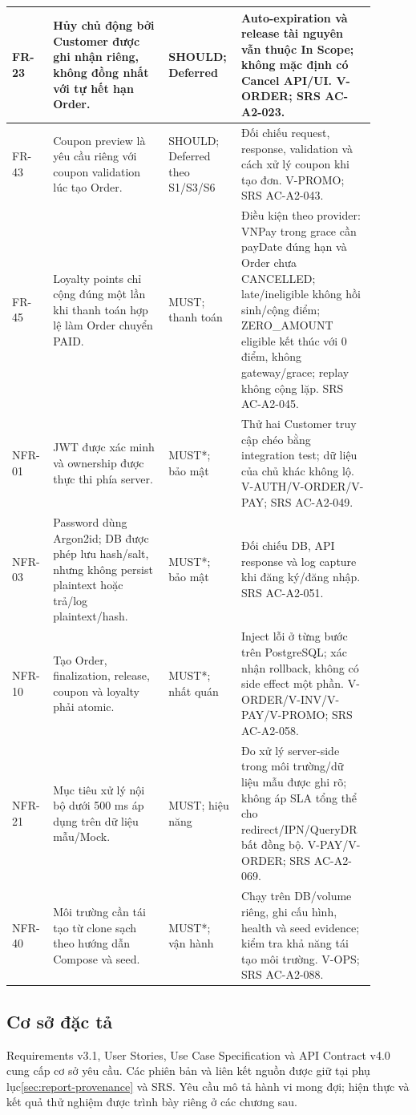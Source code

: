 \begin{longtable}{>{\raggedright\arraybackslash}p{0.10\linewidth}>{\raggedright\arraybackslash}p{0.30\linewidth}>{\raggedright\arraybackslash}p{0.16\linewidth}>{\raggedright\arraybackslash}p{0.34\linewidth}}
FR-23 & Hủy chủ động bởi Customer được ghi nhận riêng, không đồng nhất với tự hết hạn Order. & SHOULD; Deferred & Auto-expiration và release tài nguyên vẫn thuộc In Scope; không mặc định có Cancel API/UI. V-ORDER; SRS AC-A2-023. \\ \hline
FR-43 & Coupon preview là yêu cầu riêng với coupon validation lúc tạo Order. & SHOULD; Deferred theo S1/S3/S6 & Đối chiếu request, response, validation và cách xử lý coupon khi tạo đơn. V-PROMO; SRS AC-A2-043. \\ \hline
FR-45 & Loyalty points chỉ cộng đúng một lần khi thanh toán hợp lệ làm Order chuyển PAID. & MUST; thanh toán & Điều kiện theo provider: VNPay trong grace cần payDate đúng hạn và Order chưa CANCELLED; late/ineligible không hồi sinh/cộng điểm; ZERO\_AMOUNT eligible kết thúc với 0 điểm, không gateway/grace; replay không cộng lặp. SRS AC-A2-045. \\ \hline
NFR-01 & JWT được xác minh và ownership được thực thi phía server. & MUST*; bảo mật & Thử hai Customer truy cập chéo bằng integration test; dữ liệu của chủ khác không lộ. V-AUTH/V-ORDER/V-PAY; SRS AC-A2-049. \\ \hline
NFR-03 & Password dùng Argon2id; DB được phép lưu hash/salt, nhưng không persist plaintext hoặc trả/log plaintext/hash. & MUST*; bảo mật & Đối chiếu DB, API response và log capture khi đăng ký/đăng nhập. SRS AC-A2-051. \\ \hline
NFR-10 & Tạo Order, finalization, release, coupon và loyalty phải atomic. & MUST*; nhất quán & Inject lỗi ở từng bước trên PostgreSQL; xác nhận rollback, không có side effect một phần. V-ORDER/V-INV/V-PAY/V-PROMO; SRS AC-A2-058. \\ \hline
NFR-21 & Mục tiêu xử lý nội bộ dưới 500 ms áp dụng trên dữ liệu mẫu/Mock. & MUST; hiệu năng & Đo xử lý server-side trong môi trường/dữ liệu mẫu được ghi rõ; không áp SLA tổng thể cho redirect/IPN/QueryDR bất đồng bộ. V-PAY/V-ORDER; SRS AC-A2-069. \\ \hline
NFR-40 & Môi trường cần tái tạo từ clone sạch theo hướng dẫn Compose và seed. & MUST*; vận hành & Chạy trên DB/volume riêng, ghi cấu hình, health và seed evidence; kiểm tra khả năng tái tạo môi trường. V-OPS; SRS AC-A2-088. \\ \hline
\end{longtable}
\endgroup

\subsection{Cơ sở đặc tả}
Requirements v3.1, User Stories, Use Case Specification và API Contract v4.0 cung cấp cơ sở yêu cầu. Các phiên bản và liên kết nguồn được giữ tại phụ lục\ref{sec:report-provenance} và SRS. Yêu cầu mô tả hành vi mong đợi; hiện thực và kết quả thử nghiệm được trình bày riêng ở các chương sau.

